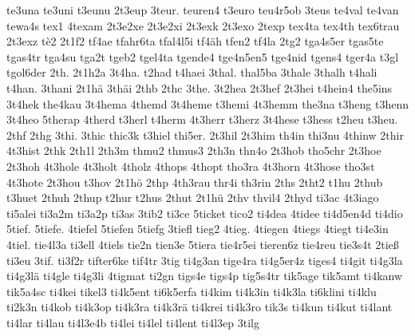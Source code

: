 {    te3una
    te3uni
    t3eunu
    2t3eup
    3teur.
    teuren4
    t3euro
    teu4r5ob
    3teus
    te4val
    te4van
    tewa4s
    tex1
    4texam
    2t3e2xe
    2t3e2xi
    2t3exk
    2t3exo
    2texp
    tex4ta
    tex4th
    tex6trau
    2t3exz
    tè2
    2t1f2
    tf4ae
    tfahr6ta
    tfal4l5i
    tf4äh
    tfen2
    tf4la
    2tg2
    tga4s5er
    tgas5te
    tgas4tr
    tga4su
    tga2t
    tgeb2
    tgel4ta
    tgende4
    tge4n5en5
    tge4nid
    tgens4
    tger4a
    t3gl
    tgol6der
    2th.
    2t1h2a
    3t4ha.
    t2had
    t4haei
    3thal.
    thal5ba
    3thale
    3thalh
    t4hali
    t4han.
    3thani
    2t1hä
    3thäi
    2thb
    2thc
    3the.
    3t2hea
    2t3hef
    2t3hei
    t4hein4
    the5ins
    3t4hek
    the4kau
    3t4hema
    4themd
    3t4heme
    t3hemi
    4t3hemm
    the3na
    t3heng
    t3henn
    3t4heo
    5therap
    4therd
    t3herl
    t4herm
    4t3herr
    t3herz
    3t4hese
    t3hess
    t2heu
    t3heu.
    2thf
    2thg
    3thi.
    3thic
    thic3k
    t3hiel
    thi5er.
    2t3hil
    2t3him
    th4in
    thi3nu
    4thinw
    2thir
    4t3hist
    2thk
    2th1l
    2th3m
    thmu2
    thmus3
    2th3n
    thn4o
    2t3hob
    tho5chr
    2t3hoe
    2t3hoh
    4t3hole
    4t3holt
    4tholz
    4thops
    4thopt
    tho3ra
    4t3horn
    4t3hose
    tho3st
    4t3hote
    2t3hou
    t3hov
    2t1hö
    2thp
    4th3rau
    thr4i
    th3rin
    2ths
    2tht2
    t1hu
    2thub
    t3huet
    2thuh
    2thup
    t2hur
    t2hus
    2thut
    2t1hü
    2thv
    thvil4
    2thyd
    ti3ac
    4t3iago
    ti5alei
    ti3a2m
    ti3a2p
    ti3as
    3tib2
    ti3ce
    5ticket
    tico2
    ti4dea
    4tidee
    ti4d5en4d
    ti4dio
    5tief.
    5tiefe.
    4tiefel
    5tiefen
    5tiefg
    3tiefl
    tieg2
    4tieg.
    4tiegen
    4tiegs
    4tiegt
    ti4e3in
    4tiel.
    tie4l3a
    ti3ell
    4tiels
    tie2n
    tien3e
    5tiera
    tie4r5ei
    tieren6z
    tie4reu
    tie3s4t
    2tieß
    ti3eu
    3tif.
    ti3f2r
    tifter6ke
    tif4tr
    3tig
    ti4g3an
    tige4ra
    ti4g5er4z
    tiges4
    ti4git
    ti4g3la
    ti4g3lä
    ti4gle
    ti4g3li
    4tigmat
    ti2gn
    tigs4e
    tigs4p
    tig5s4tr
    tik5age
    tik5amt
    ti4kanw
    tik5a4sc
    ti4kei
    tikel3
    ti4k5ent
    ti6k5erfa
    ti4kim
    ti4k3in
    ti4k3la
    ti6klini
    ti4klu
    ti2k3n
    ti4kob
    ti4k3op
    ti4k3ra
    ti4k3rä
    ti4krei
    ti4k3ro
    tik3s
    ti4kun
    ti4kut
    ti4lant
    ti4lar
    ti4lau
    ti4l3e4b
    ti4lei
    ti4lel
    ti4lent
    ti4l3ep
    3tilg
}
